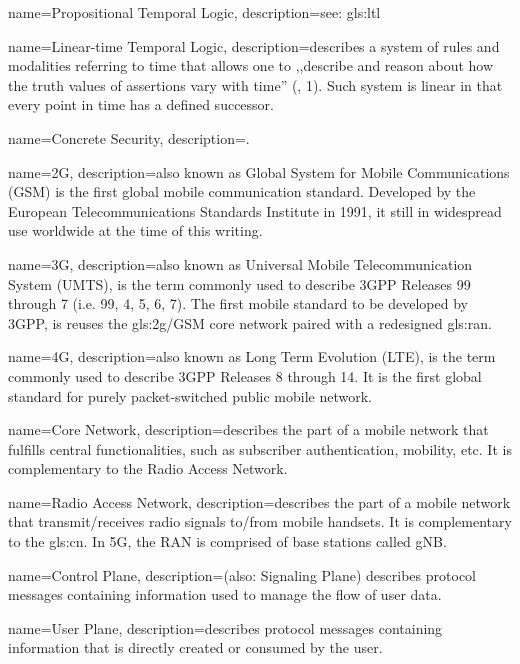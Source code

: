 {
    name={Propositional Temporal Logic},
    description={see: \gls{gls:ltl}}
}

{
    name={Linear-time Temporal Logic},
    description={describes a system of rules and modalities referring to time that allows one to ,,describe and reason about how the truth values of assertions vary
with time'' (\cite{emerson1990temporal}, 1). Such system is linear in that every point in time has a defined successor.}
}

{
    name={Concrete Security},
    description={.}
}

{
    name={2G},
    description={also known as Global System for Mobile Communications (GSM) is the first global mobile communication standard. Developed by the European Telecommunications Standards Institute in 1991, it still in widespread use worldwide at the time of this writing.}
}

{
    name={3G},
    description={also known as Universal Mobile Telecommunication System (UMTS), is the term commonly used to describe 3GPP Releases 99 through 7 (i.e. 99, 4, 5, 6, 7). The first mobile standard to be developed by 3GPP, is reuses the \gls{gls:2g}/GSM core network paired with a redesigned \gls{gls:ran}.}
}

{
    name={4G},
    description={also known as Long Term Evolution (LTE), is the term commonly used to describe 3GPP Releases 8 through 14. It is the first global standard for purely packet-switched public mobile network.}
}

{
    name={Core Network},
    description={describes the part of a mobile network that fulfills central functionalities, such as subscriber authentication, mobility, etc. It is complementary to the Radio Access Network.}
}

{
    name={Radio Access Network},
    description={describes the part of a mobile network that transmit/receives radio signals to/from mobile handsets. It is complementary to the \gls{gls:cn}. In 5G, the RAN is comprised of base stations called gNB.}
}

{
    name={Control Plane},
    description={(also: Signaling Plane) describes protocol messages containing information used to manage the flow of user data.}
}

{
    name={User Plane},
    description={describes protocol messages containing information that is directly created or consumed by the user.}
}
